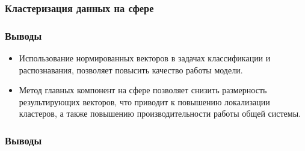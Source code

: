 \documentclass{beamer}
\begin{document}
\begin{frame}
\frametitle{Кластеризация данных на сфере}

\end{frame}

\begin{frame}
\frametitle{Выводы}
\begin{itemize}
\item Использование нормированных векторов в задачах классификации и распознавания, позволяет повысить качество работы модели.
\item Метод главных компонент на сфере позволяет снизить размерность результирующих векторов, что приводит к повышению локализации кластеров, а также повышению производительности работы общей системы.
\end{itemize}

\end{frame}

\begin{frame}
\frametitle{Выводы}

\end{frame}
\end{document}
